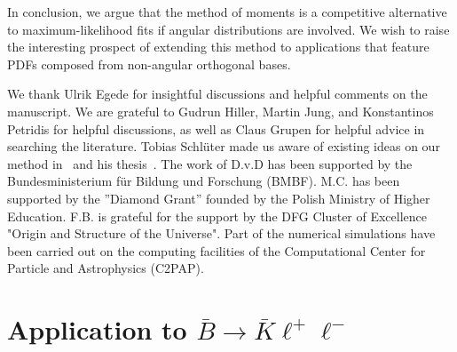 \documentclass[aps,nofootinbib,preprintnumbers,prd,twocolumn]{revtex4-1}
\begin{document}
In conclusion, we argue that the method of moments is a competitive alternative to
maximum-likelihood fits if angular distributions are involved. We wish to raise
the interesting prospect of extending this method to applications that feature
PDFs composed from non-angular orthogonal bases.

\acknowledgments

We thank Ulrik Egede for insightful discussions and helpful comments
on the manuscript. We are grateful to Gudrun Hiller, Martin Jung, and
Konstantinos Petridis for helpful discussions, as well as Claus Grupen
for helpful advice in searching the literature.  Tobias Schlüter made
us aware of existing ideas on our method in~\cite{Chung:1997qd} and
his thesis~\cite[page 123]{Schlueter:2012}. The work of D.v.D has been
supported by the Bundesministerium f\"ur Bildung und Forschung
(BMBF). M.C. has been supported by the ''Diamond Grant'' founded by
the Polish Ministry of Higher Education. F.B. is grateful for the
support by the DFG Cluster of Excellence "Origin and Structure of the
Universe". Part of the numerical simulations have been carried out on
the computing facilities of the Computational Center for Particle and
Astrophysics (C2PAP).

\appendix

\section{Application to $\bar{B}\to\bar{K}\ell^+\ell^-$}
\label{app:btokll}
\end{document}
